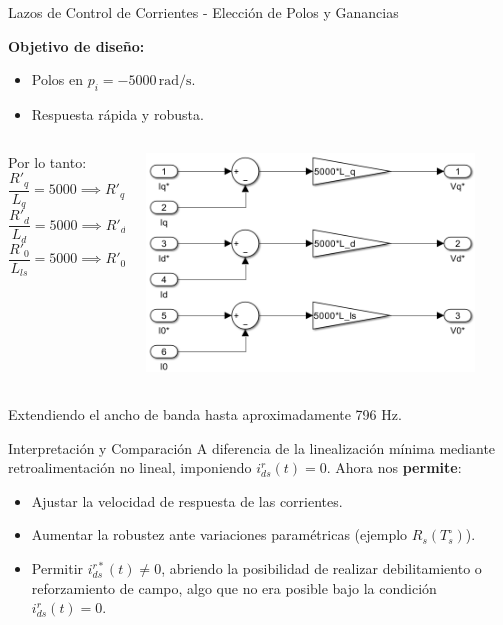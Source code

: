 \documentclass[12pt]{beamer}
\begin{document}
\begin{frame}{\small Lazos de Control de Corrientes - Elección de Polos y Ganancias} \small

\textbf{Objetivo de diseño:}
\begin{itemize}
    \item Polos en \(p_i = -5000\,\text{rad/s}\).
    \item Respuesta rápida y robusta.
\end{itemize}

\begin{columns}
    \begin{column}{0.5\textwidth}
        Por lo tanto:
        \[
        \frac{R'_q}{L_q} = 5000 \implies R'_q = 5000 L_q = 29 \, \Omega,
        \]
        \[
        \frac{R'_d}{L_d} = 5000 \implies R'_d = 5000 L_d = 33 \, \Omega,
        \]
        \[
        \frac{R'_0}{L_{ls}} = 5000 \implies R'_0 = 5000 L_{ls} = 4 \, \Omega.
        \]
    \end{column}
    
    \begin{column}{0.5\textwidth}
        \centering
        \includegraphics[width=0.9\textwidth]{Imagenes/modulador_corriente.png}
    \end{column}
\end{columns}

Extendiendo el ancho de banda hasta aproximadamente 796 Hz.
\end{frame}

\begin{frame}{Interpretación y Comparación}
A diferencia de la linealización mínima mediante retroalimentación no lineal, imponiendo \( i_{ds}^r(t)=0 \). Ahora nos \textbf{permite}:
\begin{itemize}
    \item Ajustar la velocidad de respuesta de las corrientes.
    \item Aumentar la robustez ante variaciones paramétricas (ejemplo \(R_s(T_s^\circ)\)).
    \item Permitir \( i_{ds}^{r*}(t) \neq 0 \), abriendo la posibilidad de realizar debilitamiento o reforzamiento de campo, algo que no era posible bajo la condición \(i_{ds}^r(t)=0\).
\end{itemize}
\end{frame}
\end{document}
